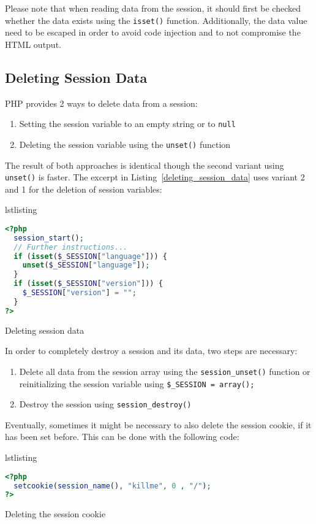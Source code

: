 \documentclass[a4paper, justified, notoc]{tufte-handout} %
\makeatletter
\newenvironment{listing}[1][htbp]
  {\ifvmode\else\unskip\fi\begin{@tufte@float}[#1]{lstlisting}{}}
  {\end{@tufte@float} } %
\makeatother
\begin{document}
Please note that when reading data from the session, it should first be checked whether the data exists using the \texttt{isset()} function. Additionally, the data value need to be escaped in order to avoid code injection and to not compromise the HTML output. 

\subsection{Deleting Session Data} %
\label{sub:deleting_session_data}
PHP provides 2 ways to delete data from a session:
\begin{enumerate}
	\item Setting the session variable to an empty string or to \texttt{null}
	\item Deleting the session variable using the \texttt{unset()} function
\end{enumerate}
The result of both approaches is identical though the second variant using \texttt{unset()} is faster. 
The excerpt in Listing~\ref{deleting_session_data} uses variant 2 and 1 for the deletion of session variables:
\begin{listing}
\begin{lstlisting}[language=PHP]
<?php
  session_start();
  // Further instructions...
  if (isset($_SESSION["language"])) {
    unset($_SESSION["language"]);
  }
  if (isset($_SESSION["version"])) {
    $_SESSION["version"] = "";
  }
?>
\end{lstlisting}
	\caption{Deleting session data}
	\label{deleting_session_data}
\end{listing}

In order to completely destroy a session and its data, two steps are necessary:
\begin{enumerate}
	\item Delete all data from the session array using the \texttt{session\_unset()} function or reinitializing the session variable using \texttt{\$\_SESSION = array();}
	\item Destroy the session using \texttt{session\_destroy()}
\end{enumerate}

Eventually, sometimes it might be necessary to also delete the session cookie, if it has been set before. 
This can be done with the following code:
\begin{listing}
\begin{lstlisting}[language=PHP]
<?php
  setcookie(session_name(), "killme", 0 , "/");
?>
\end{lstlisting}
	\caption{Deleting the session cookie}
	\label{deleting_session_cookie}
\end{listing}
\end{document}
